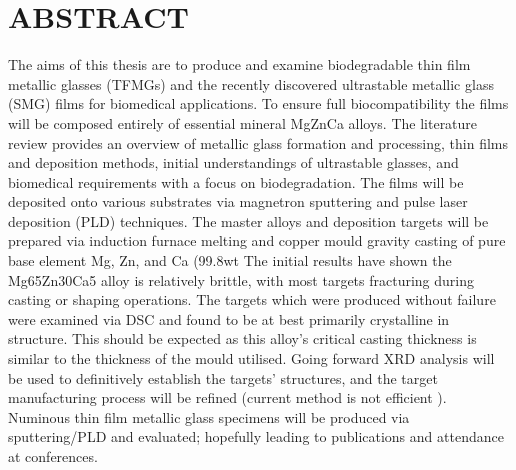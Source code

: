 \section{ABSTRACT}
 
The aims of this thesis are to produce and examine biodegradable thin film metallic glasses (TFMGs) and the recently discovered ultrastable metallic glass (SMG) films for biomedical applications. To ensure full biocompatibility the films will be composed entirely of essential mineral MgZnCa alloys.
The literature review provides an overview of metallic glass formation and processing, thin films and deposition methods, initial understandings of ultrastable glasses, and biomedical requirements with a focus on biodegradation. 
The films will be deposited onto various substrates via magnetron sputtering and pulse laser deposition (PLD) techniques. The master alloys and deposition targets will be prepared via induction furnace melting and copper mould gravity casting of pure base element Mg, Zn, and Ca (99.8wt%
The initial results have shown the Mg65Zn30Ca5 alloy is relatively brittle, with most targets fracturing during casting or shaping operations. The targets which were produced without failure were examined via DSC and found to be at best primarily crystalline in structure. This should be expected as this alloy’s critical casting thickness is similar to the thickness of the mould utilised. 
Going forward XRD analysis will be used to definitively establish the targets’ structures, and the target manufacturing process will be refined (current method is not efficient ). Numinous thin film metallic glass specimens will be produced via sputtering/PLD and evaluated; hopefully leading to publications and attendance at conferences. 

